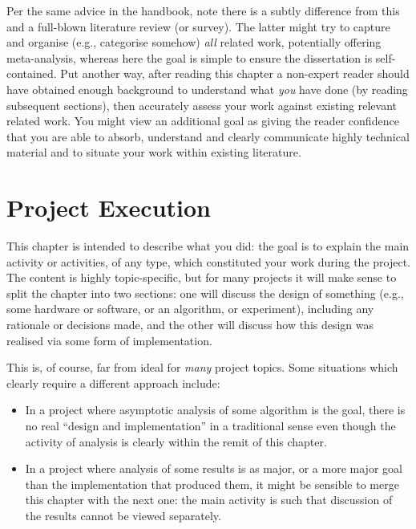 \documentclass[ oneside,%
                    author={Joshua Felmeden},
                    degree={MEng},
                     title={Semantic Analysis of Financial Headlines Based on Realised Stock Returns},
                  subtitle={}]{dissertation}
\begin{document}
Per the same advice in the handbook, note there is a subtly difference from this and a full-blown literature review (or survey).  The latter might try to capture and organise (e.g., categorise somehow) \emph{all} related work, potentially offering meta-analysis, whereas here the goal is simple to ensure the dissertation is self-contained.  Put another way, after reading this chapter a non-expert reader should have obtained enough background to understand what \emph{you} have done (by reading subsequent sections), then accurately assess your work against existing relevant related work.  You might view an additional goal as giving the reader confidence that you are able to absorb, understand and clearly communicate highly technical material and to situate your work within existing literature.








\chapter{Project Execution}
\label{chap:execution}

\noindent
This chapter is intended to describe what you did: the goal is to explain
the main activity or activities, of any type, which constituted your work 
during the project.  The content is highly topic-specific, but for many 
projects it will make sense to split the chapter into two sections: one 
will discuss the design of something (e.g., some hardware or software, or 
an algorithm, or experiment), including any rationale or decisions made, 
and the other will discuss how this design was realised via some form of 
implementation.  

This is, of course, far from ideal for {\em many} project topics.  Some
situations which clearly require a different approach include:

\begin{itemize}
\item In a project where asymptotic analysis of some algorithm is the goal,
      there is no real ``design and implementation'' in a traditional sense
      even though the activity of analysis is clearly within the remit of
      this chapter.
\item In a project where analysis of some results is as major, or a more
      major goal than the implementation that produced them, it might be
      sensible to merge this chapter with the next one: the main activity 
      is such that discussion of the results cannot be viewed separately.
\end{itemize}
\end{document}
